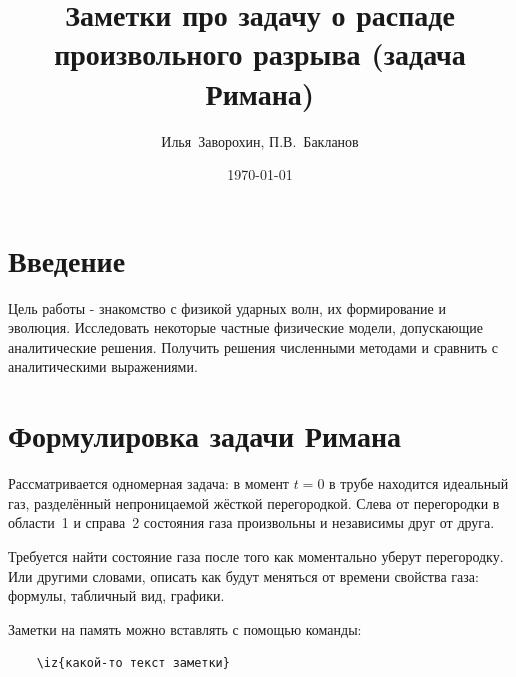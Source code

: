 \documentclass[a4paper,12pt]{extarticle}
\begin{document}
\title{\large
 Заметки про задачу о распаде произвольного разрыва (задача Римана)
}

\author{Илья~Заворохин, П.В.~Бакланов}

\date{\today}

\maketitle

\tableofcontents







\section{Введение}

Цель работы - знакомство с физикой ударных волн, их формирование и эволюция.
Исследовать некоторые частные физические модели, допускающие аналитические решения. 
Получить решения численными методами и сравнить с аналитическими выражениями. 

\section{Формулировка задачи Римана}

Рассматривается одномерная задача: 
в момент $t=0$ в трубе находится идеальный газ, разделённый  непроницаемой жёсткой перегородкой. 
Слева от перегородки в области~1 и  справа~2 состояния газа произвольны и независимы друг от друга. 


Требуется найти состояние газа после того как моментально уберут перегородку. 
Или другими словами, описать как будут меняться от времени свойства газа: формулы, табличный вид, графики. 

Заметки на память можно вставлять с помощью команды:
\begin{verbatim}
	\iz{какой-то текст заметки}
\end{verbatim}
 
\end{document}
